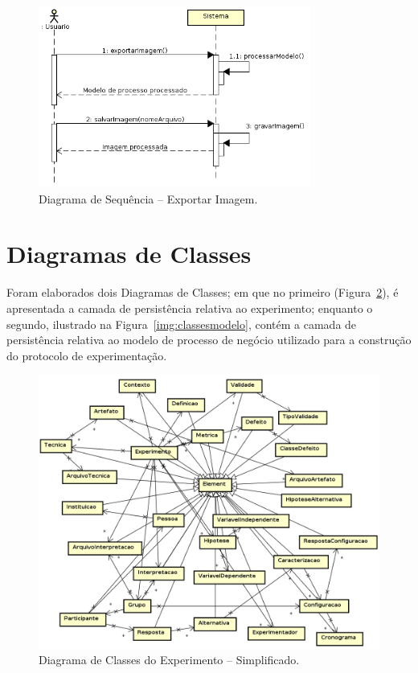 \begin{figure}[!htb]
\centering
\includegraphics[width=0.8\textwidth]{images/exportarimagem.png}
\caption{Diagrama de Sequência -- Exportar Imagem.}
\label{img:exportarimagem}
\end{figure}


\section{Diagramas de Classes}

Foram elaborados dois Diagramas de Classes; em que no primeiro (Figura~\ref{img:classesexperimento}), é apresentada a camada de persistência relativa ao experimento; enquanto o segundo, ilustrado na Figura~\ref{img:classesmodelo}, contém a camada de persistência relativa ao modelo de processo de negócio utilizado para a construção do protocolo de experimentação.


\begin{figure}[!htb]
\centering
\includegraphics[width=\textwidth]{images/classesexperimento.png}
\caption{Diagrama de Classes do Experimento -- Simplificado.}
\label{img:classesexperimento}
\end{figure}

